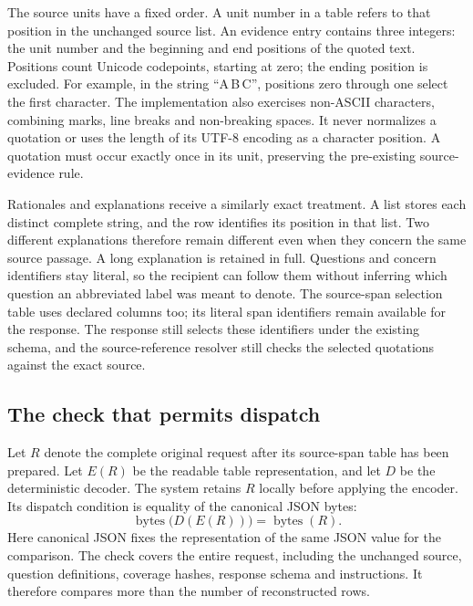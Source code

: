 The source units have a fixed order. A unit number in a table refers to that
position in the unchanged source list. An evidence entry contains three
integers: the unit number and the beginning and end positions of the quoted
text. Positions count Unicode codepoints, starting at zero; the ending position
is excluded. For example, in the string ``A\,B\,C'', positions zero through
one select the first character. The implementation also exercises non-ASCII
characters, combining marks, line breaks and non-breaking spaces. It never
normalizes a quotation or uses the length of its UTF-8 encoding as a character
position. A quotation must occur exactly once in its unit, preserving the
pre-existing source-evidence rule.

Rationales and explanations receive a similarly exact treatment. A list stores
each distinct complete string, and the row identifies its position in that list.
Two different explanations therefore remain different even when they concern
the same source passage. A long explanation is retained in full. Questions and
concern identifiers stay literal, so the recipient can follow them without
inferring which question an abbreviated label was meant to denote. The
source-span selection table uses declared columns too; its literal span
identifiers remain available for the response. The response still selects these
identifiers under the existing schema, and the source-reference resolver still
checks the selected quotations against the exact source.

\subsection{The check that permits dispatch}

Let $R$ denote the complete original request after its source-span table has
been prepared. Let $E(R)$ be the readable table representation, and let $D$ be
the deterministic decoder. The system retains $R$ locally before applying the
encoder. Its dispatch condition is equality of the canonical JSON bytes:
\begin{equation}
 \operatorname{bytes}\bigl(D(E(R))\bigr)
   = \operatorname{bytes}(R).
 \label{eq:lossless-request-roundtrip}
\end{equation}
Here canonical JSON fixes the representation of the same JSON value for the
comparison. The check covers the entire request, including the unchanged source,
question definitions, coverage hashes, response schema and instructions. It
therefore compares more than the number of reconstructed rows.


